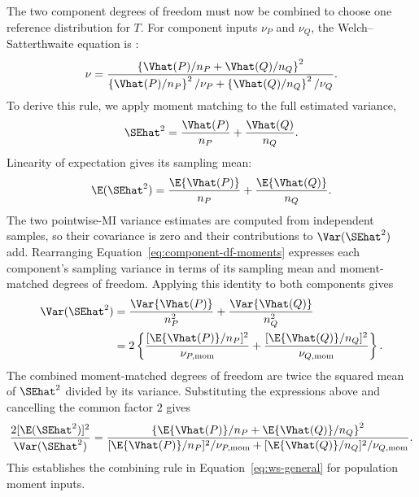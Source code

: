 The two component degrees of freedom must now be combined to choose one
reference distribution for \(T\). For component inputs \(\nu_P\) and
\(\nu_Q\), the Welch--Satterthwaite equation is
\citep{satterthwaite1946,welch1947}:
\begin{equation}
  \nu
  =
  \frac{
  \left\{\Vhat(P)/n_P+\Vhat(Q)/n_Q\right\}^2
  }{
  \left\{\Vhat(P)/n_P\right\}^2/\nu_P
  +\left\{\Vhat(Q)/n_Q\right\}^2/\nu_Q
  }.
  \label{eq:ws-general}
\end{equation}
To derive this rule, we apply moment matching to the full estimated
variance,
\begin{equation*}
  \SEhat^2=\frac{\Vhat(P)}{n_P}+\frac{\Vhat(Q)}{n_Q}.
\end{equation*}
Linearity of expectation gives its sampling mean:
\begin{equation*}
  \E(\SEhat^2)
  =\frac{\E\{\Vhat(P)\}}{n_P}
   +\frac{\E\{\Vhat(Q)\}}{n_Q}.
\end{equation*}
The two pointwise-MI variance estimates are computed from independent
samples, so their covariance is zero and their contributions to
\(\Var(\SEhat^2)\) add. Rearranging
Equation~\eqref{eq:component-df-moments} expresses each component's sampling
variance in terms of its sampling mean and moment-matched degrees of
freedom. Applying this identity to both components gives
\begin{align*}
  \Var(\SEhat^2)
  &=\frac{\Var\{\Vhat(P)\}}{n_P^2}
    +\frac{\Var\{\Vhat(Q)\}}{n_Q^2}\\*
  &=2\left\{
    \frac{[\E\{\Vhat(P)\}/n_P]^2}{\nu_{P,\mathrm{mom}}}
    +\frac{[\E\{\Vhat(Q)\}/n_Q]^2}{\nu_{Q,\mathrm{mom}}}
    \right\}.
\end{align*}
The combined moment-matched degrees of freedom are twice the squared mean
of \(\SEhat^2\) divided by its variance. Substituting the expressions above
and cancelling the common factor \(2\) gives
\begin{equation*}
  \frac{2[\E(\SEhat^2)]^2}{\Var(\SEhat^2)}
  =\frac{
    \left\{\E\{\Vhat(P)\}/n_P+\E\{\Vhat(Q)\}/n_Q\right\}^2
    }{
    [\E\{\Vhat(P)\}/n_P]^2/\nu_{P,\mathrm{mom}}
    +[\E\{\Vhat(Q)\}/n_Q]^2/\nu_{Q,\mathrm{mom}}
    }.
\end{equation*}
This establishes the combining rule in Equation~\eqref{eq:ws-general} for
population moment inputs.

